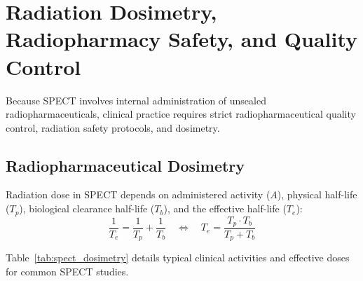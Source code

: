 \documentclass[11pt,a4paper]{article}
\begin{document}
\section{Radiation Dosimetry, Radiopharmacy Safety, and Quality Control}

Because SPECT involves internal administration of unsealed radiopharmaceuticals, clinical practice requires strict radiopharmaceutical quality control, radiation safety protocols, and dosimetry.

\subsection{Radiopharmaceutical Dosimetry}
Radiation dose in SPECT depends on administered activity ($A$), physical half-life ($T_p$), biological clearance half-life ($T_b$), and the effective half-life ($T_e$):
\begin{equation}
    \frac{1}{T_e} = \frac{1}{T_p} + \frac{1}{T_b} \quad \iff \quad T_e = \frac{T_p \cdot T_b}{T_p + T_b}
\end{equation}

Table~\ref{tab:spect_dosimetry} details typical clinical activities and effective doses for common SPECT studies.
\end{document}

